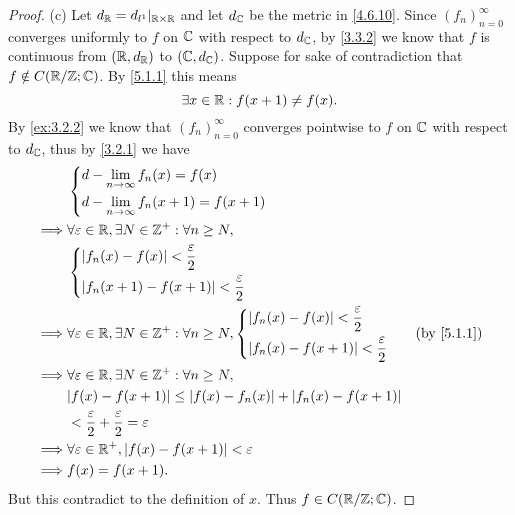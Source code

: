 \begin{proof}{(c)}
  Let \(d_{\mathbb{R}} = d_{l^1}|_{\mathbb{R} \times \mathbb{R}}\) and let \(d_{\mathbb{C}}\) be the metric in \cref{4.6.10}.
  Since \((f_n)_{n = 0}^\infty\) converges uniformly to \(f\) on \(\mathbb{C}\) with respect to \(d_{\mathbb{C}}\), by \cref{3.3.2} we know that \(f\) is continuous from \((\mathbb{R}, d_{\mathbb{R}})\) to \((\mathbb{C}, d_{\mathbb{C}})\).
  Suppose for sake of contradiction that \(f \notin C(\mathbb{R} / \mathbb{Z} ; \mathbb{C})\).
  By \cref{5.1.1} this means
  \[
    \exists x \in \mathbb{R} : f(x + 1) \neq f(x).
  \]
  By \cref{ex:3.2.2} we know that \((f_n)_{n = 0}^\infty\) converges pointwise to \(f\) on \(\mathbb{C}\) with respect to \(d_{\mathbb{C}}\), thus by \cref{3.2.1} we have
  \begin{align*}
             & \begin{dcases}
                 d - \lim_{n \to \infty} f_n(x) = f(x) \\
                 d - \lim_{n \to \infty} f_n(x + 1) = f(x + 1)
               \end{dcases}                                                                       \\
    \implies & \forall \varepsilon \in \R, \exists N \in \Z^+ : \forall n \geq N,                                                 \\
             & \begin{dcases}
                 \abs{f_n(x) - f(x)} < \dfrac{\varepsilon}{2} \\
                 \abs{f_n(x + 1) - f(x + 1)} < \dfrac{\varepsilon}{2}
               \end{dcases}                                                                \\
    \implies & \forall \varepsilon \in \R, \exists N \in \Z^+ : \forall n \geq N, \begin{dcases}
                                                                                    \abs{f_n(x) - f(x)} < \dfrac{\varepsilon}{2} \\
                                                                                    \abs{f_n(x) - f(x + 1)} < \dfrac{\varepsilon}{2}
                                                                                  \end{dcases} &  & \by{5.1.1} \\
    \implies & \forall \varepsilon \in \R, \exists N \in \Z^+ : \forall n \geq N,                                                 \\
             & \abs{f(x) - f(x + 1)} \leq \abs{f(x) - f_n(x)} + \abs{f_n(x) - f(x + 1)}                                           \\
             & < \dfrac{\varepsilon}{2} + \dfrac{\varepsilon}{2} = \varepsilon                                                    \\
    \implies & \forall \varepsilon \in \R^+, \abs{f(x) - f(x + 1)} < \varepsilon                                                  \\
    \implies & f(x) = f(x + 1).
  \end{align*}
  But this contradict to the definition of \(x\).
  Thus \(f \in C(\mathbb{R} / \mathbb{Z} ; \mathbb{C})\).
\end{proof}

